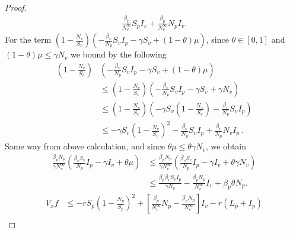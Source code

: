 \begin{proof}
\begin{equation}
\begin{aligned}
				\frac{\beta_p}{N ^ \infty_v} S_p I_v + 
				\frac{\beta_p}{N ^ \infty_v} N_p I_v .
		\end{aligned}
	\end{equation}
	For the term $\left(
				1 - 
				\frac{N_v}{S_v}
			\right)
			\left(
				-\frac{\beta_v}{N_p} S_v I_p - 
				\gamma S_v + 
				(1 - \theta) \mu 
			\right) $,
			since $\theta\in [0,1]$ and $(1-\theta)\mu\leq \gamma N_v$
			we bound by the following
	\begin{equation}\label{theorem2term2}
		\begin{aligned}
			\left(
				1 - 
				\frac{N_v}{S_v}
			\right)
			&
			\left(
				-\frac{\beta_v}{N_p} S_v I_p - 
				\gamma S_v + 
				(1 - \theta) \mu 
			\right) 
			\\
			&
			\leq
				\left(
					1 - \frac{N_v}{S_v}
				\right)
				\left(- 
					\frac{\beta_v}{N_p} S_v I_p -
					\gamma S_v +\gamma N_v
				\right)
			\\
			&\leq
				\left(
					1 - \frac{N_v}{S_v}
				\right)
				\left(-
					\gamma S_v
					\left(
						1 - 
						\frac{N_v}{S_v}
					\right) -
					\frac{\beta_v}{N_p} S_v I_p
				\right)
			\\
			&\leq
				-\gamma S_v 
				\left(
					1- 
					\frac{N_v}{S_v}
				\right) ^ 2 - 
				\frac{\beta_v}{N_p} S_v I_p + 
				\frac{\beta_v}{N_p} N_v I_p \ .
		\end{aligned}
	\end{equation}
	Same way from above calculation, and since 
	$\theta \mu\leq \theta\gamma N_v$, we obtain
	\begin{equation}
		\label{theorem2term3}
		\begin{aligned}
			\frac{\beta_p N_p}{\gamma N^\infty_v}
			\left(
				\frac{\beta_v S_v}{N_p} I_p- 
				\gamma I_v + \theta \mu
			\right)
			&\leq
				\frac{\beta_p N_p}{\gamma N^\infty_v}
				\left(
					\frac{\beta_v S_v}{N_p} I_p -
					\gamma I_v + 
					\theta \gamma N_v
				\right) 
			\\
			&\leq
				\frac{\beta_p \beta_v S_v I_p}{\gamma N_v} - 
				\frac{\beta_p N_p}{ N^\infty_v} I_v + 
				\beta_p \theta N_p.
		\end{aligned}
	\end{equation}
	\begin{align*}
		V_x f 
			& \leq
				- r S_p 
				\left(
					1 - 
					\frac{N_p}{S_p}
				\right) ^ 2 + 
				\left[
					\frac{\beta_p}{N^\infty_v} N_p - 
					\frac{\beta_p N_p}{ N^\infty_v}
				\right] I_v - 
				r (L_p + I_p)
			\\

\end{align*}
\end{proof}
